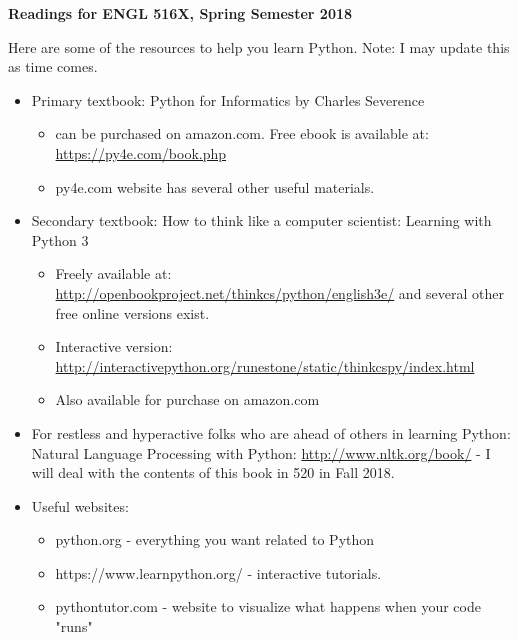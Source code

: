 \documentclass[11pt,a4paper]{article}
\begin{document}
\begin{center}
\textbf {Readings for ENGL 516X, Spring Semester 2018}
\end{center}

Here are some of the resources to help you learn Python. Note: I may update this as time comes. 

\begin{itemize}
\item Primary textbook: Python for Informatics by Charles Severence
   \begin{itemize}
   \item can be purchased on amazon.com. Free ebook is available at: \\ \url{https://py4e.com/book.php}
   \item py4e.com website has several other useful materials.
   \end{itemize}
 \item Secondary textbook: How to think like a computer scientist: Learning with Python 3
 \begin{itemize}
 \item Freely available at: \url{http://openbookproject.net/thinkcs/python/english3e/} and several other free online versions exist.
 \item Interactive version: \url{http://interactivepython.org/runestone/static/thinkcspy/index.html}
 \item Also available for purchase on amazon.com
 \end{itemize} 
 \item For restless and hyperactive folks who are ahead of others in learning Python: Natural Language Processing with Python: \url{http://www.nltk.org/book/} - I will deal with the contents of this book in 520 in Fall 2018.

\item Useful websites:
   \begin{itemize}
     \item python.org - everything you want related to Python
   \item https://www.learnpython.org/ - interactive tutorials.
   \item  pythontutor.com  - website to visualize what happens when your code "runs"
      \end{itemize}
     

\end{itemize}
\end{document}
